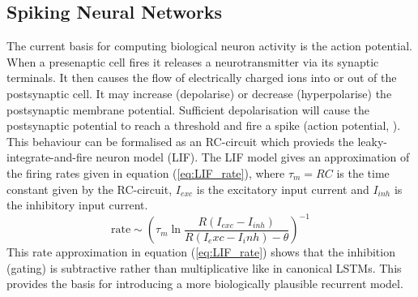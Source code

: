 \subsection{Spiking Neural Networks}
The current basis for computing biological neuron activity is the action potential. When a presenaptic cell fires it releases a neurotransmitter via its synaptic terminals. It then causes the flow of electrically charged ions into or out of the postsynaptic cell. It may increase (depolarise) or decrease (hyperpolarise) the postsynaptic membrane potential. Sufficient depolarisation will cause the postsynaptic potential to reach a threshold and fire a spike (action potential, \cite{kandel_schwartz_jessell_2000}). This behaviour can be formalised as an RC-circuit which provieds the leaky-integrate-and-fire neuron model (LIF). The LIF model gives an approximation of the firing rates \cite{gerstner_kistler_2008} given in equation (\ref{eq:LIF_rate}), where $\tau_m = RC$ is the time constant given by the RC-circuit, $I_{exc}$ is the excitatory input current and $I_{inh}$ is the inhibitory input current.
\begin{equation}\label{eq:LIF_rate}
    \text{rate} \sim  \left(\tau_m \ln\frac{R(I_{exc} - I_{inh})}{R(I_exc - I_inh) - 
    \theta} \right)^{-1}
\end{equation}
This rate approximation in equation (\ref{eq:LIF_rate}) shows that the inhibition (gating) is subtractive rather than multiplicative like in canonical LSTMs. This provides the basis for introducing a more biologically plausible recurrent model.